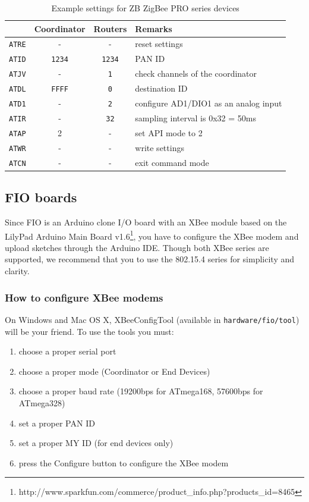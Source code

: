 \documentclass[9pt]{jsarticle}
\begin{document}
\begin{table}[htdp]
\begin{center}
\small
\begin{tabular}{|r|c|c|l|}
\hline   & Coordinator & Routers & Remarks \\\hline
\hline \texttt{ATRE} & - & - & reset settings \\
\hline \texttt{ATID} & \texttt{1234} & \texttt{1234} & PAN ID \\
\hline \texttt{ATJV} & - & \texttt{1} & check channels of the coordinator \\
\hline \texttt{ATDL} & \texttt{FFFF} & \texttt{0} & destination ID \\
\hline \texttt{ATD1} & - & \texttt{2} & configure AD1/DIO1 as an analog input \\
\hline \texttt{ATIR} & - & \texttt{32} & sampling interval is 0x32 = 50ms \\
\hline \texttt{ATAP} & 2 & - & set API mode to 2 \\
\hline \texttt{ATWR} & - & - & write settings \\
\hline \texttt{ATCN} & - & - & exit command mode \\
\hline 
\end{tabular} 
\caption{Example settings for ZB ZigBee PRO series devices}
\end{center}
\label{xbee}
\end{table}

\clearpage
\subsection{FIO boards}
Since FIO is an Arduino clone I/O board with an XBee module based on the LilyPad Arduino Main Board v1.6\footnote{http://www.sparkfun.com/commerce/product\_info.php?products\_id=8465}, you have to configure the XBee modem and upload sketches through the Arduino IDE. Though both XBee series are supported, we recommend that you to use the 802.15.4 series for simplicity and clarity.

\subsubsection{How to configure XBee modems}
On Windows and Mac OS X, XBeeConfigTool (available in \texttt{hardware/fio/tool}) will be your friend. To use the tools you must:

\begin{enumerate}
\item choose a proper serial port
\item choose a proper mode (Coordinator or End Devices)
\item choose a proper baud rate (19200bps for ATmega168, 57600bps for ATmega328)
\item set a proper PAN ID
\item set a proper MY ID (for end devices only)
\item press the Configure button to configure the XBee modem 
\end{enumerate}
\end{document}
